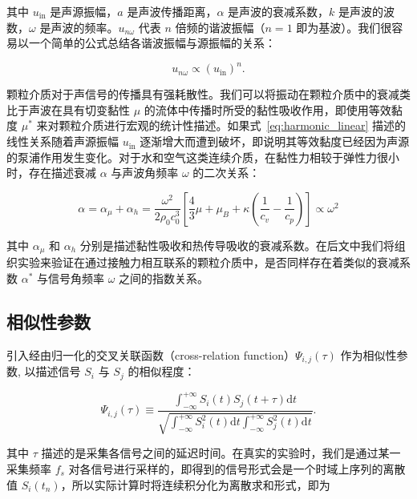 其中 $u_{\text{in}}$ 是声源振幅，$a$ 是声波传播距离，$\alpha$ 是声波的衰减系数，$k$ 是声波的波数，$\omega$ 是声波的频率。$u_{n\omega}$ 代表 $n$ 倍频的谐波振幅（$n=1$ 即为基波）。我们很容易以一个简单的公式总结各谐波振幅与源振幅的关系：

\begin{equation}
  u_{n\omega} \propto \left(u_{\text{in}}\right)^{n}.\label{eq:harmonic_linear}
\end{equation}

颗粒介质对于声信号的传播具有强耗散性。我们可以将振动在颗粒介质中的衰减类比于声波在具有切变黏性 $\mu$ 的流体中传播时所受的黏性吸收作用，即使用等效黏度 $\mu^{*}$ 来对颗粒介质进行宏观的统计性描述。如果式~\eqref{eq:harmonic_linear} 描述的线性关系随着声源振幅 $u_{\text{in}}$ 逐渐增大而遭到破坏，即说明其等效黏度已经因为声源的泵浦作用发生变化。对于水和空气这类连续介质，在黏性力相较于弹性力很小时，存在描述衰减 $\alpha$ 与声波角频率 $\omega$ 的二次关系：

\begin{equation}
  \alpha = \alpha_{\mu} + \alpha_{h} = \frac{\omega^{2}}{2\rho_{0}c_{0}^{3}}\left[\frac{4}{3}\mu + \mu_{B} + \kappa\left(\frac{1}{c_{v}} - \frac{1}{c_{p}}\right)\right]\propto \omega^{2}
\end{equation}

其中 $\alpha_{\mu}$ 和 $\alpha_{h}$ 分别是描述黏性吸收和热传导吸收的衰减系数。在后文中我们将组织实验来验证在通过接触力相互联系的颗粒介质中，是否同样存在着类似的衰减系数 $\alpha^{*}$ 与信号角频率 $\omega$ 之间的指数关系。

\subsection{相似性参数}

引入经由归一化的交叉关联函数（cross-relation function）$\Psi_{i,j}(\tau)$ 作为相似性参数, 以描述信号 $S_{i}$ 与 $S_{j}$ 的相似程度\cite{PhysRevLett.90.174302}：

\begin{equation}
  \Psi_{i,j}(\tau) \equiv \frac{\int_{-\infty}^{+\infty}S_{i}(t)S_{j}(t+\tau)\mathrm{d}t}{\sqrt{\int_{-\infty}^{+\infty}S_{i}^{2}(t)\mathrm{d}t\int_{-\infty}^{+\infty}S_{j}^{2}(t)\mathrm{d}t}}.
\end{equation}

其中 $\tau$ 描述的是采集各信号之间的延迟时间。在真实的实验时，我们是通过某一采集频率 $f_{s}$ 对各信号进行采样的，即得到的信号形式会是一个时域上序列的离散值 $S_{i}(t_{n})$，所以实际计算时将连续积分化为离散求和形式，即为

